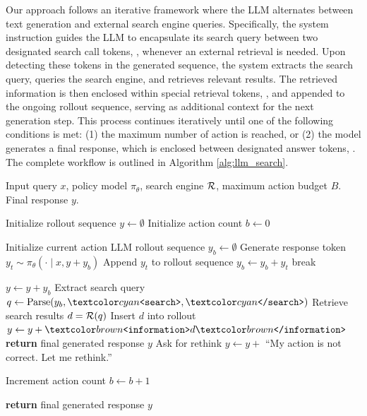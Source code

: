 Our approach follows an iterative framework where the LLM alternates between text generation and external search engine queries. Specifically, the system instruction guides the LLM to encapsulate its search query between two designated search call tokens, , whenever an external retrieval is needed. Upon detecting these tokens in the generated sequence, the system extracts the search query, queries the search engine, and retrieves relevant results.
The retrieved information is then enclosed within special retrieval tokens, , and appended to the ongoing rollout sequence, serving as additional context for the next generation step. 
This process continues iteratively until one of the following conditions is met: (1) the maximum number of action is reached, or (2) the model generates a final response, which is enclosed between designated answer tokens, .
The complete workflow is outlined in Algorithm \ref{alg:llm_search}.


\begin{algorithm}[t]
\caption{LLM Response Rollout with Multi-Turn Search Engine Calls}
\label{alg:llm_search}
\begin{algorithmic}[1]
\Require Input query \( x \), policy model \( \pi_{\theta} \), search engine \( \mathcal{R} \), maximum action budget \( B \).
\Ensure Final response \( y \).

\State Initialize rollout sequence \( y \gets \emptyset \)
\State Initialize action count \( b \gets 0 \)

    \State Initialize current action LLM rollout sequence \( y_b \gets \emptyset \) 
    \State Generate response token \( y_t \sim \pi_{\theta}(\cdot \mid x, y + y_b) \)
    \State Append \( y_t \) to rollout sequence \( y_b \gets y_b + y_t \)
        break
    \EndIf
    \EndWhile

    \State \( y  \gets  y + y_b \)
        \State Extract search query \( q \gets \text{Parse}(y_b, \search{,} ) \)
        \State Retrieve search results \( d = \mathcal{R}(q) \)
        \State Insert $d$ into rollout \( y  \gets  y + \info{d}  \)
        \State \textbf{return} final generated response \( y \)
    \Else
        \State Ask for rethink \( y  \gets  y + \) ``My action is not correct. Let me rethink.''
    \EndIf

    \State Increment action count \( b \gets b + 1 \)
\EndWhile

\State \textbf{return} final generated response \( y \)
\end{algorithmic}
\end{algorithm}


